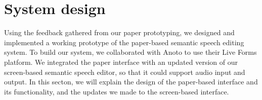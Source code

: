






\section{System design}\label{sec:paper-design}





Using the feedback gathered from our paper prototyping, we designed and implemented a working prototype of the
paper-based semantic speech editing system. To build our system, we collaborated with Anoto to use their Live Forms
platform. We integrated the paper interface with an updated version of our screen-based semantic speech editor, so that
it could support audio input and output.  In this secton, we will explain the design of the paper-based interface and
its functionality, and the updates we made to the screen-based interface.

